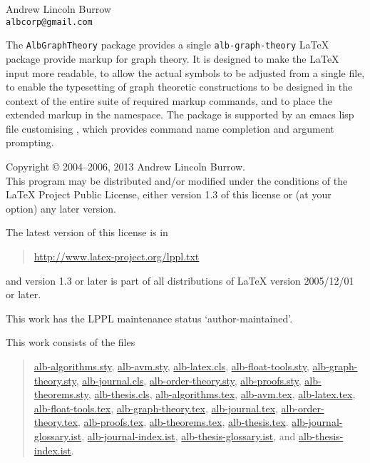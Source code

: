 \documentclass[11pt,a4paper,oneside,titlepage]{alb-latex}
\begin{document}


\begin{albTitlePage}


  Andrew Lincoln Burrow\\
  \texttt{albcorp@gmail.com}



  The \texttt{AlbGraphTheory} package provides a single
  \texttt{alb-graph-theory} \LaTeX{} package provide markup for graph
  theory.  It is designed to make the \LaTeX{} input more readable, to
  allow the actual symbols to be adjusted from a single file, to enable
  the typesetting of graph theoretic constructions to be designed in the
  context of the entire suite of required markup commands, and to place
  the extended markup in the \albLogo{} namespace.  The package is
  supported by an emacs lisp file customising \AUCTeX{}, which provides
  command name completion and argument prompting.



  Copyright \copyright{} 2004--2006, 2013 Andrew Lincoln Burrow.\\
  This program may be distributed and/or modified under the conditions
  of the \LaTeX{} Project Public License, either version 1.3 of this
  license or (at your option) any later version.

  \medskip{}

  The latest version of this license is in
  \begin{quote}
    \url{http://www.latex-project.org/lppl.txt}
  \end{quote}
  and version 1.3 or later is part of all distributions of LaTeX version
  2005/12/01 or later.

  \medskip{}

  This work has the LPPL maintenance status `author-maintained'.

  \medskip{}

  This work consists of the files
  \begin{quote}
    \begin{flushleft}
      \url{alb-algorithms.sty}, \url{alb-avm.sty}, \url{alb-latex.cls},
      \url{alb-float-tools.sty}, \url{alb-graph-theory.sty},
      \url{alb-journal.cls}, \url{alb-order-theory.sty},
      \url{alb-proofs.sty}, \url{alb-theorems.sty},
      \url{alb-thesis.cls}, \url{alb-algorithms.tex}, \url{alb-avm.tex},
      \url{alb-latex.tex}, \url{alb-float-tools.tex},
      \url{alb-graph-theory.tex}, \url{alb-journal.tex},
      \url{alb-order-theory.tex}, \url{alb-proofs.tex},
      \url{alb-theorems.tex}, \url{alb-thesis.tex}.
      \url{alb-journal-glossary.ist}, \url{alb-journal-index.ist},
      \url{alb-thesis-glossary.ist}, and \url{alb-thesis-index.ist}.
    \end{flushleft}
  \end{quote}



\end{albTitlePage}
\end{document}
